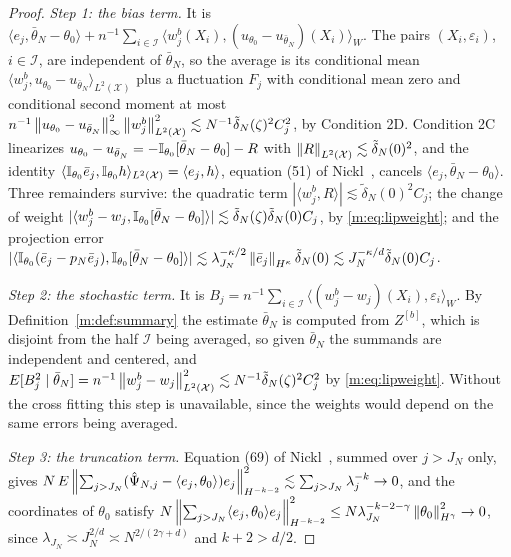 \begin{proof}
\emph{Step 1: the bias term.} It is $\langle e_j,\bar\theta_N-\theta_0\rangle+n^{-1}\sum_{i\in\mathcal I}\langle w^b_j(X_i),(u_{\theta_0}-u_{\bar\theta_N})(X_i)\rangle_W$. The pairs $(X_i,\varepsilon_i)$, $i\in\mathcal I$, are independent of $\bar\theta_N$, so the average is its conditional mean $\langle w^b_j,u_{\theta_0}-u_{\bar\theta_N}\rangle_{L^2(\mathcal X)}$ plus a fluctuation $F_j$ with conditional mean zero and conditional second moment at most $n^{-1}\left\|u_{\theta_0}-u_{\bar\theta_N}\right\|^2_\infty\left\|w^b_j\right\|^2_{L^2(\mathcal X)}\lesssim N^{-1}\tilde\delta_N(\zeta)^2C_j^2$, by Condition 2D. Condition 2C linearizes $u_{\theta_0}-u_{\bar\theta_N}=-\mathbb{I}_{\theta_0}[\bar\theta_N-\theta_0]-R$ with $\left\|R\right\|_{L^2(\mathcal X)}\lesssim\tilde\delta_N(0)^2$, and the identity $\langle\mathbb{I}_{\theta_0}\bar e_j,\mathbb{I}_{\theta_0}h\rangle_{L^2(\mathcal X)}=\langle e_j,h\rangle$, equation (51) of Nickl~\cite{nicklbvm2024}, cancels $\langle e_j,\bar\theta_N-\theta_0\rangle$. Three remainders survive: the quadratic term $|\langle w^b_j,R\rangle|\lesssim\tilde\delta_N(0)^2C_j$; the change of weight $|\langle w^b_j-w_j,\mathbb{I}_{\theta_0}[\bar\theta_N-\theta_0]\rangle|\lesssim\tilde\delta_N(\zeta)\tilde\delta_N(0)C_j$, by \eqref{m:eq:lipweight}; and the projection error $|\langle\mathbb{I}_{\theta_0}(\bar e_j-p_N\bar e_j),\mathbb{I}_{\theta_0}[\bar\theta_N-\theta_0]\rangle|\lesssim\lambda_{J_N}^{-\kappa/2}\left\|\bar e_j\right\|_{H^\kappa}\tilde\delta_N(0)\lesssim J_N^{-\kappa/d}\tilde\delta_N(0)C_j$.

\emph{Step 2: the stochastic term.} It is $B_j=n^{-1}\sum_{i\in\mathcal I}\langle(w^b_j-w_j)(X_i),\varepsilon_i\rangle_W$. By Definition~\ref{m:def:summary} the estimate $\bar\theta_N$ is computed from $Z^{[b]}$, which is disjoint from the half $\mathcal I$ being averaged, so given $\bar\theta_N$ the summands are independent and centered, and $E[B_j^2\mid\bar\theta_N]=n^{-1}\left\|w^b_j-w_j\right\|^2_{L^2(\mathcal X)}\lesssim N^{-1}\tilde\delta_N(\zeta)^2C_j^2$ by \eqref{m:eq:lipweight}. Without the cross fitting this step is unavailable, since the weights would depend on the same errors being averaged.

\emph{Step 3: the truncation term.} Equation (69) of Nickl~\cite{nicklbvm2024}, summed over $j>J_N$ only, gives $N\,E\left\|\sum_{j>J_N}(\hat\Psi_{N,j}-\langle e_j,\theta_0\rangle)e_j\right\|^2_{H^{-k-2}}\lesssim\sum_{j>J_N}\lambda_j^{-k}\to0$, and the coordinates of $\theta_0$ satisfy $N\left\|\sum_{j>J_N}\langle e_j,\theta_0\rangle e_j\right\|^2_{H^{-k-2}}\le N\lambda_{J_N}^{-k-2-\gamma}\left\|\theta_0\right\|^2_{H^\gamma}\to0$, since $\lambda_{J_N}\asymp J_N^{2/d}\asymp N^{2/(2\gamma+d)}$ and $k+2>d/2$.


\end{proof}
